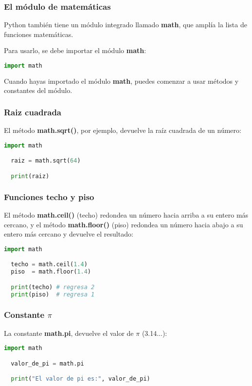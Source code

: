 \begin{frame}[fragile]
  \frametitle{El módulo de matemáticas}

  Python también tiene un módulo integrado llamado \textbf{math},
  que amplía la lista de funciones matemáticas.

  \vspace{\baselineskip}
  Para usarlo, se debe importar el módulo \textbf{math}:

  \vspace{\baselineskip}
  \begin{lstlisting}[language=Python]
  import math
  \end{lstlisting}

  \vspace{\baselineskip}
  Cuando hayas importado el módulo \textbf{math}, puedes comenzar
  a usar métodos y constantes del módulo.
\end{frame}

\begin{frame}[fragile]
  \frametitle{Raiz cuadrada}

  El método \textbf{math.sqrt()}, por ejemplo, devuelve la raíz
  cuadrada de un número:

  \begin{lstlisting}[language=Python]
  import math

  raiz = math.sqrt(64)

  print(raiz)
  \end{lstlisting}
\end{frame}

\begin{frame}[fragile]
  \frametitle{Funciones techo y piso}

  El método \textbf{math.ceil()} (techo) redondea un número hacia arriba a
  su entero más cercano, y el método \textbf{math.floor()} (piso) redondea
  un número hacia abajo a su entero más cercano y devuelve el resultado:

  \begin{lstlisting}[language=Python]
  import math

  techo = math.ceil(1.4)
  piso  = math.floor(1.4)

  print(techo) # regresa 2
  print(piso)  # regresa 1
  \end{lstlisting}
\end{frame}

\begin{frame}[fragile]
  \frametitle{Constante $\pi$}

  La constante \textbf{math.pi}, devuelve el valor de $\pi$ (3.14...):

  \begin{lstlisting}[language=Python]
  import math

  valor_de_pi = math.pi

  print("El valor de pi es:", valor_de_pi)
  \end{lstlisting}
\end{frame}
